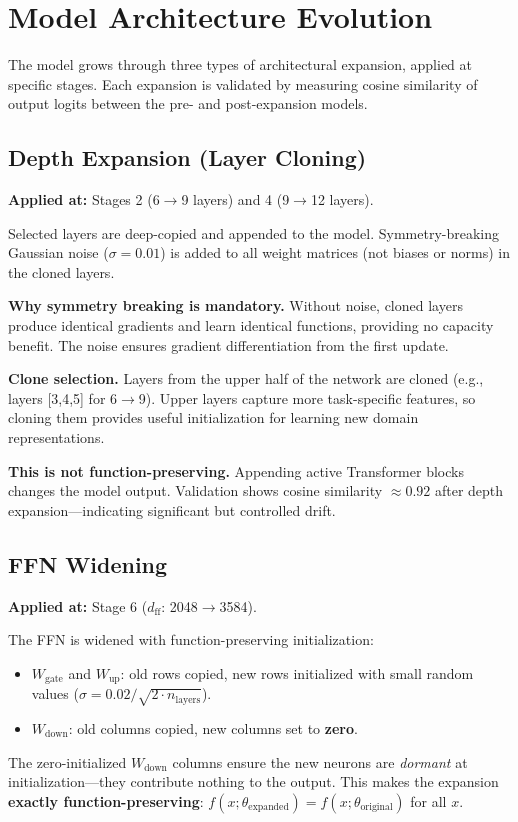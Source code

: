 \section{Model Architecture Evolution}
\label{sec:expansion}

The model grows through three types of architectural expansion, applied at
specific stages.  Each expansion is validated by measuring cosine similarity
of output logits between the pre- and post-expansion models.

\subsection{Depth Expansion (Layer Cloning)}

\textbf{Applied at:} Stages 2 (6$\to$9 layers) and 4 (9$\to$12 layers).

Selected layers are deep-copied and appended to the model.  Symmetry-breaking
Gaussian noise ($\sigma = 0.01$) is added to all weight matrices (not biases
or norms) in the cloned layers.

\textbf{Why symmetry breaking is mandatory.}
Without noise, cloned layers produce identical gradients and learn identical
functions, providing no capacity benefit.  The noise ensures gradient
differentiation from the first update.

\textbf{Clone selection.}
Layers from the upper half of the network are cloned (e.g., layers [3,4,5] for
6$\to$9).  Upper layers capture more task-specific features, so cloning them
provides useful initialization for learning new domain representations.

\textbf{This is not function-preserving.}
Appending active Transformer blocks changes the model output.  Validation shows
cosine similarity $\approx 0.92$ after depth expansion---indicating significant
but controlled drift.

\subsection{FFN Widening}

\textbf{Applied at:} Stage 6 ($d_\text{ff}$: 2048$\to$3584).

The FFN is widened with function-preserving initialization:
\begin{itemize}[nosep]
  \item $W_\text{gate}$ and $W_\text{up}$: old rows copied, new rows initialized
        with small random values ($\sigma = 0.02/\sqrt{2 \cdot n_\text{layers}}$).
  \item $W_\text{down}$: old columns copied, new columns set to \textbf{zero}.
\end{itemize}
The zero-initialized $W_\text{down}$ columns ensure the new neurons are
\emph{dormant} at initialization---they contribute nothing to the output.
This makes the expansion \textbf{exactly function-preserving}:
$f(x; \theta_\text{expanded}) = f(x; \theta_\text{original})$ for all $x$.

